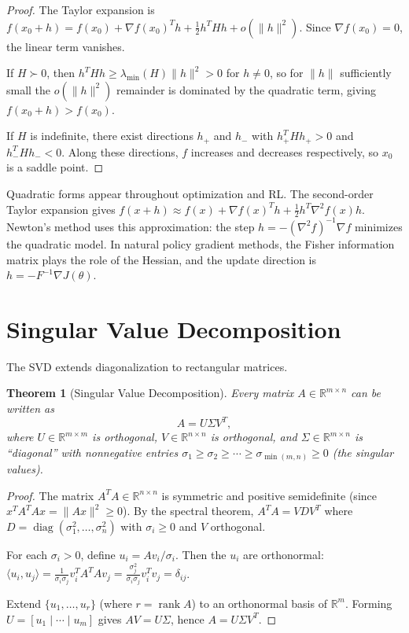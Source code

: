 \documentclass[11pt,a4paper]{article}
\theoremstyle{definition}
\theoremstyle{plain}
\newtheorem{theorem}{Theorem}[section]
\theoremstyle{remark}
\newcommand{\R}{\mathbb{R}}
\DeclareMathOperator{\rank}{rank}
\DeclareMathOperator{\diag}{diag}
\begin{document}
\begin{proof}
The Taylor expansion is $f(x_0 + h) = f(x_0) + \nabla f(x_0)^T h + \frac{1}{2} h^T H h
+ o(\|h\|^2)$. Since $\nabla f(x_0) = 0$, the linear term vanishes.

If $H \succ 0$, then $h^T H h \geq \lambda_{\min}(H) \|h\|^2 > 0$ for $h \neq 0$, so for
$\|h\|$ sufficiently small the $o(\|h\|^2)$ remainder is dominated by the quadratic term,
giving $f(x_0 + h) > f(x_0)$.

If $H$ is indefinite, there exist directions $h_+$ and $h_-$ with $h_+^T H h_+ > 0$ and
$h_-^T H h_- < 0$. Along these directions, $f$ increases and decreases respectively, so
$x_0$ is a saddle point.
\end{proof}

\begin{rlconnection}
Quadratic forms appear throughout optimization and RL. The second-order Taylor expansion
gives $f(x + h) \approx f(x) + \nabla f(x)^T h + \frac{1}{2} h^T \nabla^2 f(x) h$.
Newton's method uses this approximation: the step $h = -(\nabla^2 f)^{-1} \nabla f$
minimizes the quadratic model. In natural policy gradient methods, the Fisher information
matrix plays the role of the Hessian, and the update direction is
$h = -F^{-1} \nabla J(\theta)$.
\end{rlconnection}

\section{Singular Value Decomposition}
\label{sec:svd}

The SVD extends diagonalization to rectangular matrices.

\begin{theorem}[Singular Value Decomposition]
\label{thm:svd}
Every matrix $A \in \R^{m \times n}$ can be written as
\[
    A = U \Sigma V^T,
\]
where $U \in \R^{m \times m}$ is orthogonal, $V \in \R^{n \times n}$ is orthogonal, and
$\Sigma \in \R^{m \times n}$ is ``diagonal'' with nonnegative entries
$\sigma_1 \geq \sigma_2 \geq \cdots \geq \sigma_{\min(m,n)} \geq 0$ (the \emph{singular values}).
\end{theorem}

\begin{proof}
The matrix $A^TA \in \R^{n \times n}$ is symmetric and positive semidefinite (since
$x^T A^T A x = \|Ax\|^2 \geq 0$). By the spectral theorem, $A^T A = V D V^T$ where
$D = \diag(\sigma_1^2, \ldots, \sigma_n^2)$ with $\sigma_i \geq 0$ and $V$ orthogonal.

For each $\sigma_i > 0$, define $u_i = Av_i / \sigma_i$. Then the $u_i$ are orthonormal:
$\langle u_i, u_j \rangle = \frac{1}{\sigma_i \sigma_j} v_i^T A^T A v_j
= \frac{\sigma_j^2}{\sigma_i \sigma_j} v_i^T v_j = \delta_{ij}$.

Extend $\{u_1, \ldots, u_r\}$ (where $r = \rank A$) to an orthonormal basis of $\R^m$.
Forming $U = [u_1 \mid \cdots \mid u_m]$ gives $AV = U\Sigma$, hence $A = U\Sigma V^T$.
\end{proof}
\end{document}
